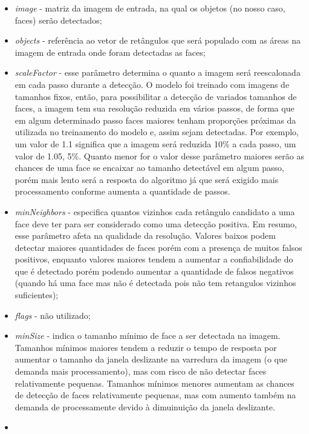 
\begin{itemize}
    \item \emph{image} - matriz da imagem de entrada, na qual os objetos (no nosso caso, faces) serão detectados;
    \item \emph{objects} - referência ao vetor de retângulos que será populado com as áreas na imagem de entrada onde foram detectadas as faces;
    \item \emph{scaleFactor} - esse parâmetro determina o quanto a imagem será reescalonada em cada passo durante a detecção. O modelo foi treinado com imagens de tamanhos fixos, então, para possibilitar a detecção de variados tamanhos de faces, a imagem tem sua resolução reduzida em vários passos, de forma que em algum determinado passo faces maiores tenham proporções próximas da utilizada no treinamento do modelo e, assim sejam detectadas. Por exemplo, um valor de 1.1 significa que a imagem será reduzida 10\% a cada passo, um valor de 1.05, 5\%. Quanto menor for o valor desse parâmetro maiores serão as chances de uma face se encaixar ao tamanho detectável em algum passo, porém mais lento será a resposta do algoritmo já que será exigido mais processamento conforme aumenta a quantidade de passos.
    \item \emph{minNeighbors} - especifica quantos vizinhos cada retângulo candidato a uma face deve ter para ser considerado como uma detecção positiva. Em resumo, esse parâmetro afeta na qualidade da resolução. Valores baixos podem detectar maiores quantidades de faces porém com a presença de muitos falsos positivos, enquanto valores maiores tendem a aumentar a confiabilidade do que é detectado porém podendo aumentar a quantidade de falsos negativos (quando há uma face mas não é detectada pois não tem retangulos vizinhos suficientes);
    \item \emph{flags} - não utilizado;
    \item \emph{minSize} - indica o tamanho mínimo de face a ser detectada na imagem. Tamanhos mínimos maiores tendem a reduzir o tempo de resposta por aumentar o tamanho da janela deslizante na varredura da imagem (o que demanda mais processamento), mas com risco de não detectar faces relativamente pequenas. Tamanhos mínimos menores aumentam as chances de detecção de faces relativamente pequenas, mas com aumento também na demanda de processamente devido à dimuinuição da janela deslizante.
    \item 
\end{itemize}

